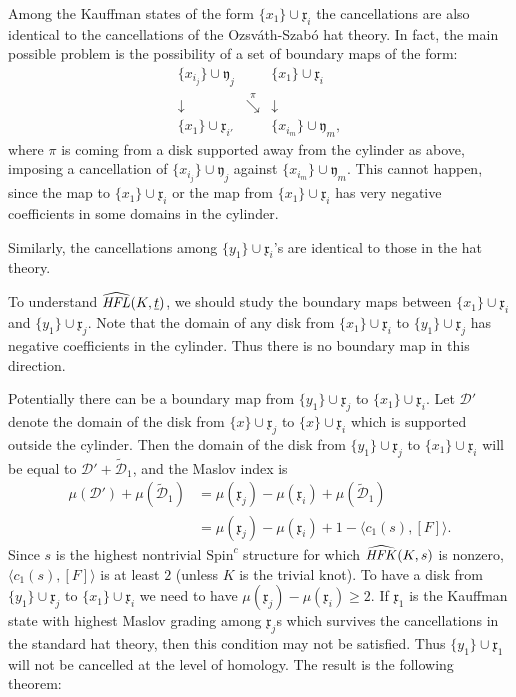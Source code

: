 \documentclass{gtart_h}
\theoremstyle{definition}
\newcommand{\ut}{\underline{t}}
\newcommand\HFK{\text{\it HFK\/}}
\newcommand\HFL{\text{\it HFL\/}}
\newcommand{\SpinC}{{\mathrm{Spin}}^c}
\begin{document}
Among the Kauffman states of the form $\{x_1\}\cup\mathfrak{x}_i$ the cancellations
are also identical to the cancellations of the Ozsv\'ath-Szab\'o hat theory.
In fact, the main possible problem is the possibility of a set of boundary maps
of the form:
\begin{displaymath}
\begin{array}{ccc}
\{x_{i_j}\}\cup\mathfrak{y}_j& & \{x_1\}\cup\mathfrak{x}_i\\
\downarrow & \stackrel{\pi}{\searrow} &\downarrow\\
\{x_1\}\cup\mathfrak{x}_{i'} & &\{x_{i_m}\}\cup\mathfrak{y}_m,
\end{array}
\end{displaymath}
where $\pi$ is coming from a disk supported away from the cylinder as
above, imposing a cancellation of $\{x_{i_j}\}\cup\mathfrak{y}_j$
against $\{x_{i_m}\}\cup\mathfrak{y}_m$.
This cannot happen, since the map to $\{x_1\}\cup\mathfrak{x}_i$ or
the map from $\{x_1\}\cup\mathfrak{x}_i$ has very negative coefficients
in some domains in the cylinder.

Similarly, the cancellations among $\{y_1\}\cup\mathfrak{x}_i$'s are identical
to those in the hat theory.

To understand $\widehat{\HFL}(K,\ut)$, we should study the boundary maps between
$\{x_1\}\cup\mathfrak{x}_i$ and $\{y_1\}\cup\mathfrak{x}_j$. Note that
the domain of any disk from $\{x_1\}\cup\mathfrak{x}_i$ to $\{y_1\}\cup\mathfrak{x}_j$
has negative coefficients in the cylinder. Thus there is no boundary map in this direction.

Potentially there can be a  boundary map from $\{y_1\}\cup\mathfrak{x}_j$ to
$\{x_1\}\cup\mathfrak{x}_i$. Let $\mathcal{D}'$ denote the domain
of the disk from $\{x\}\cup\mathfrak{x}_j$ to $\{x\}\cup\mathfrak{x}_i$ which is supported
outside the cylinder. Then the domain of the disk from $\{y_1\}\cup\mathfrak{x}_j$ to
$\{x_1\}\cup\mathfrak{x}_i$ will  be equal to
$\mathcal{D}'+\tilde{\mathcal{D}}_1$, and the Maslov index is
\begin{equation}
\begin{split}
\mu(\mathcal{D}')+\mu(\tilde{\mathcal{D}}_1)&=\mu(\mathfrak{x}_j)-\mu(\mathfrak{x}_i)
+\mu(\tilde{\mathcal{D}}_1)\\
&=\mu(\mathfrak{x}_j)-\mu(\mathfrak{x}_i)+1-\langle c_1(s),[F]\rangle .
\end{split}
\end{equation}
Since $s$ is  the highest nontrivial $\SpinC$ structure for which
$\widehat{\HFK}(K,s)$ is nonzero, $\langle c_1(s),[F]\rangle $ is
at least $2$ (unless $K$ is the trivial knot). To have a disk from
$\{y_1\}\cup\mathfrak{x}_j$ to $\{x_1\}\cup\mathfrak{x}_i$ we need
to have $\mu(\mathfrak{x}_j)-\mu(\mathfrak{x}_i)\geq 2$. If
$\mathfrak{x}_1$ is the Kauffman state with highest Maslov grading
among $\mathfrak{x}_j$s which survives the cancellations in the
standard hat theory, then this condition may not be satisfied.
Thus $\{y_1\}\cup\mathfrak{x}_1$ will not be cancelled at the
level of homology. The result is the following
theorem:
\end{document}

